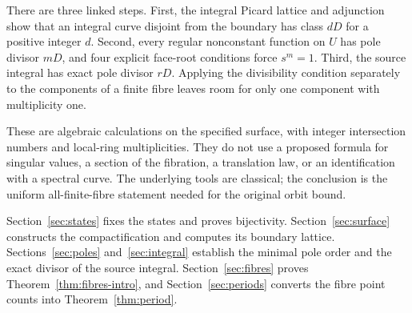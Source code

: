 

There are three linked steps. First, the integral Picard lattice and
adjunction show that an integral curve disjoint from the boundary has
class \(dD\) for a positive integer \(d\). Second, every regular
nonconstant function on \(U\) has pole divisor \(mD\), and four
explicit face-root conditions force \(s^m=1\). Third, the source
integral has exact pole divisor \(rD\). Applying the divisibility
condition separately to the components of a finite fibre leaves room
for only one component with multiplicity one.

These are algebraic calculations on the specified surface, with
integer intersection numbers and local-ring multiplicities. They do
not use a proposed formula for singular values, a section of the
fibration, a translation law, or an identification with a spectral
curve. The underlying tools are classical; the conclusion is the
uniform all-finite-fibre statement needed for the original orbit bound.

Section~\ref{sec:states} fixes the states and proves bijectivity.
Section~\ref{sec:surface} constructs the compactification and computes
its boundary lattice. Sections~\ref{sec:poles} and~\ref{sec:integral}
establish the minimal pole order and the exact divisor of the source
integral. Section~\ref{sec:fibres} proves
Theorem~\ref{thm:fibres-intro}, and Section~\ref{sec:periods} converts
the fibre point counts into Theorem~\ref{thm:period}.
